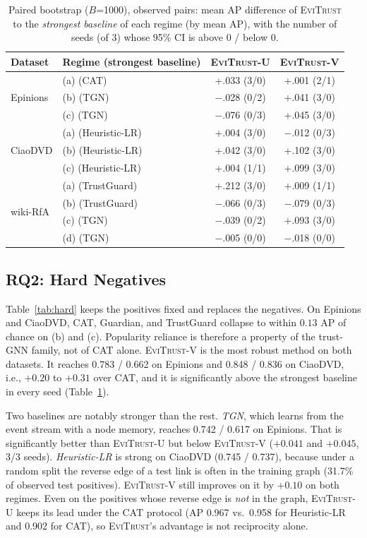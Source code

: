 \documentclass[conference]{IEEEtran}
\newcommand{\evi}{\textsc{EviTrust}}
\newcommand{\eviU}{\textsc{EviTrust}-U}
\newcommand{\eviV}{\textsc{EviTrust}-V}
\begin{document}
\begin{table}[t]
\centering
\caption{Paired bootstrap ($B$=1000), observed pairs: mean AP difference of \evi{} to the \emph{strongest baseline} of each regime (by mean AP), with the number of seeds (of 3) whose 95\% CI is above 0 / below 0.}
\label{tab:paired}
\setlength{\tabcolsep}{2.4pt}
\begin{tabular}{llcc}
\toprule
Dataset & Regime (strongest baseline) & \eviU{} & \eviV{} \\
\midrule
\multirow{3}{*}{Epinions} & (a) (CAT) & +.033 (3/0) & +.001 (2/1) \\
& (b) (TGN) & $-$.028 (0/2) & +.041 (3/0) \\
& (c) (TGN) & $-$.076 (0/3) & +.045 (3/0) \\
\midrule
\multirow{3}{*}{CiaoDVD} & (a) (Heuristic-LR) & +.004 (3/0) & $-$.012 (0/3) \\
& (b) (Heuristic-LR) & +.042 (3/0) & +.102 (3/0) \\
& (c) (Heuristic-LR) & +.004 (1/1) & +.099 (3/0) \\
\midrule
\multirow{4}{*}{wiki-RfA} & (a) (TrustGuard) & +.212 (3/0) & +.009 (1/1) \\
& (b) (TrustGuard) & $-$.066 (0/3) & $-$.079 (0/3) \\
& (c) (TGN) & $-$.039 (0/2) & +.093 (3/0) \\
& (d) (TGN) & $-$.005 (0/0) & $-$.018 (0/0) \\
\bottomrule
\end{tabular}
\end{table}

\subsection{RQ2: Hard Negatives}
\label{sec:rq2}

Table~\ref{tab:hard} keeps the positives fixed and replaces the negatives. On Epinions and CiaoDVD, CAT, Guardian, and TrustGuard collapse to within $0.13$ AP of chance on (b) and (c). Popularity reliance is therefore a property of the trust-GNN family, not of CAT alone. \eviV{} is the most robust method on both datasets. It reaches 0.783 / 0.662 on Epinions and 0.848 / 0.836 on CiaoDVD, i.e., $+0.20$ to $+0.31$ over CAT, and it is significantly above the strongest baseline in every seed (Table~\ref{tab:paired}).

Two baselines are notably stronger than the rest. \emph{TGN}, which learns from the event stream with a node memory, reaches 0.742 / 0.617 on Epinions. That is significantly better than \eviU{} but below \eviV{} ($+0.041$ and $+0.045$, 3/3 seeds). \emph{Heuristic-LR} is strong on CiaoDVD (0.745 / 0.737), because under a random split the reverse edge of a test link is often in the training graph (31.7\% of observed test positives). \eviV{} still improves on it by $+0.10$ on both regimes. Even on the positives whose reverse edge is \emph{not} in the graph, \eviU{} keeps its lead under the CAT protocol (AP 0.967 vs.\ 0.958 for Heuristic-LR and 0.902 for CAT), so \evi{}'s advantage is not reciprocity alone.
\end{document}
